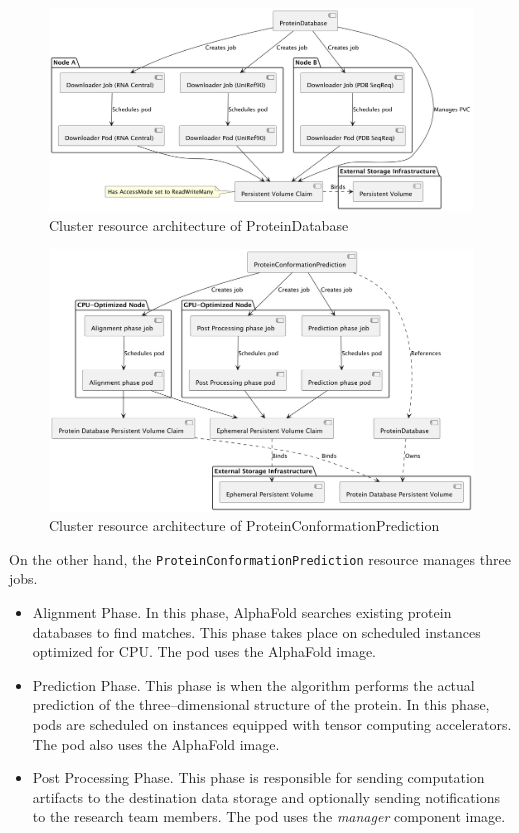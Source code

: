 \begin{figure}[htbp]
    \centering
    \includegraphics[width=\textwidth]{images/proteindatabase}
    \caption{Cluster resource architecture of ProteinDatabase}
    \label{fig:proteindatabase}
\end{figure}

\begin{figure}[htbp]
    \centering
    \includegraphics[width=\textwidth]{images/proteinconformationprediction}
    \caption{Cluster resource architecture of ProteinConformationPrediction}
    \label{fig:proteinconformationprediction}
\end{figure}

On the other hand, the \texttt{ProteinConformationPrediction} resource manages three jobs.
\begin{itemize}
    \item Alignment Phase.
    In this phase, AlphaFold searches existing protein databases to find matches.
    This phase takes place on scheduled instances optimized for CPU. The pod uses the AlphaFold image.
    \item Prediction Phase.
    This phase is when the algorithm performs the actual prediction of the three--dimensional structure of the protein.
    In this phase, pods are scheduled on instances equipped with tensor computing accelerators.
    The pod also uses the AlphaFold image.
    \item Post Processing Phase.
    This phase is responsible for sending computation artifacts to the destination data storage and optionally sending notifications to the research team members.
    The pod uses the \textit{manager} component image.
\end{itemize}

